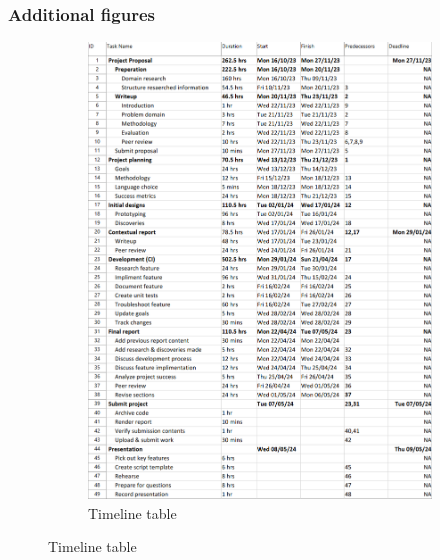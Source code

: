 
\subsubsection{Additional figures}

\begin{figure}
    \vspace{-50px}
    \centering
    \caption{Project Timeline}
    \label{fig:ProjectTimeline}
    \begin{subfigure}[t]{0.5\textwidth}
        \caption{Timeline table}
        \label{fig:ProjectTimelineChart}
        \includegraphics[width=0.5\textheight]{../TimelineChart.png}
    \end{subfigure}

\end{figure}
